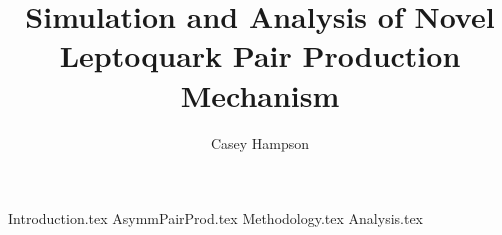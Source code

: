 \documentclass[titlepage]{article}
\title{Simulation and Analysis of Novel Leptoquark Pair Production Mechanism}
\author{Casey Hampson}
\begin{document}
    \maketitle
    \tableofcontents
    \pagebreak

    
    {Introduction.tex}
    {AsymmPairProd.tex}
    {Methodology.tex}
    {Analysis.tex}
            

    \pagebreak
    \pagebreak
    
    
    
\end{document}
